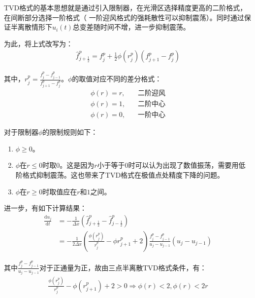 \documentclass[12pt, a4paper]{article}
\begin{document}
TVD格式的基本思想就是通过引入限制器，在光滑区选择精度更高的二阶格式，在间断部分选择一阶格式（
一阶迎风格式的强耗散性可以抑制震荡）。同时通过保证半离散情形下$u_i(t)$总变差随时间不增，进一步抑制震荡。

为此，将上式改写为：
\begin{align}
    \widehat{f}^p_{j+\frac{1}{2}} = f^p_{j} + \frac{1}{2}\phi(r^p_j)(f^p_{j+1}-f^p_{j})
\end{align}

其中，$r^p_j = \frac{f^p_j-f^p_{j-1}}{f^p_{j+1}-f^p_{j}}$。$\phi$的取值对应不同的差分格式：
\begin{align}
    \phi (r) = r,&\quad\text{二阶迎风}\\
    \phi (r) = 1,&\quad\text{二阶中心}\\
    \phi (r) = 0,&\quad\text{一阶中心}
\end{align}

对于限制器$\phi$的限制规则如下：
\begin{enumerate}
    \item $\phi\geqslant0$。
    \item $\phi$在$r\leqslant0$时取0。这是因为$r$小于等于0时可以认为出现了数值振荡，需要用低阶格式抑制震荡。这也带来了TVD格式在极值点处精度下降的问题。
    \item $\phi$在$r\geqslant0$时取值应在$r$和$1$之间。
\end{enumerate}

进一步，有如下计算结果：
\begin{align}
    \frac{\mathrm{d}{u_j}}{\mathrm{d}{t}} &= -\frac{1}{\Delta x}(\widehat{f}^p_{j+\frac{1}{2}} - \widehat{f}^p_{j-\frac{1}{2}})\\
    &=-\frac{1}{2\Delta x}(\frac{\phi(r^p_j)}{r^p_j} - \phi{r^p_{j+1}} + 2)\frac{f^p_j - f^p_{j-1}}{u_j-u_{j-1}}(u_j-u_{j-1})
\end{align}

其中$\frac{f^p_j - f^p_{j-1}}{u_j-u_{j-1}}$对于正通量为正，故由三点半离散TVD格式条件，有：
\begin{align}
    \frac{\phi(r^p_j)}{r^p_j} - \phi(r^p_{j+1}) + 2 > 0 \Rightarrow \phi(r) < 2, \phi(r) < 2r
\end{align}
\end{document}
